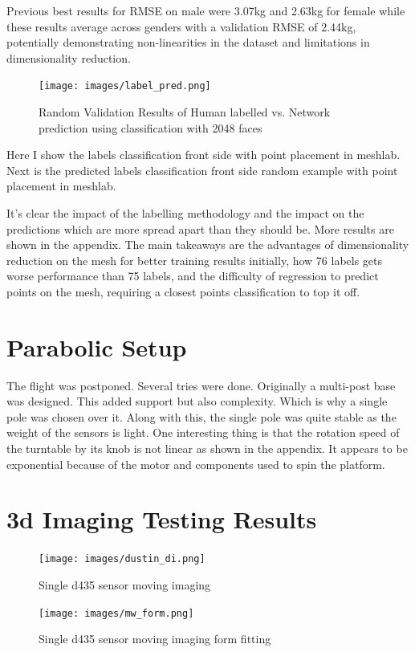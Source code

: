 Previous best results for RMSE on male were 3.07kg and 2.63kg for female while these results average across genders with a validation RMSE of 2.44kg, potentially demonstrating non-linearities in the dataset and limitations in dimensionality reduction.


\begin{figure}[!htb]
	\caption{Random Validation Results of Human labelled vs. Network prediction using classification with 2048 faces}
	\centering
	\texttt{[image: images/label\_pred.png]}
\end{figure}

Here I show the labels classification front side with point placement in meshlab. Next is the predicted labels classification front side random example with point placement in meshlab.

It's clear the impact of the labelling methodology and the impact on the predictions which are more spread apart than they should be. More results are shown in the appendix. The main takeaways are the advantages of dimensionality reduction on the mesh for better training results initially, how 76 labels gets worse performance than 75 labels, and the difficulty of regression to predict points on the mesh, requiring a closest points classification to top it off.

\section{Parabolic Setup}
The flight was postponed. Several tries were done. Originally a multi-post base was designed. This added support but also complexity. Which is why a single pole was chosen over it. Along with this, the single pole was quite stable as the weight of the sensors is light. One interesting thing is that the rotation speed of the turntable by its knob is not linear as shown in the appendix. It appears to be exponential because of the motor and components used to spin the platform.

\section{3d Imaging Testing Results}

\begin{figure}[!htb]
	\caption{Single d435 sensor moving imaging}
	\centering
	\texttt{[image: images/dustin\_di.png]}
\end{figure}

\begin{figure}[!htb]
	\caption{Single d435 sensor moving imaging form fitting}
	\centering
	\texttt{[image: images/mw\_form.png]}
\end{figure}



